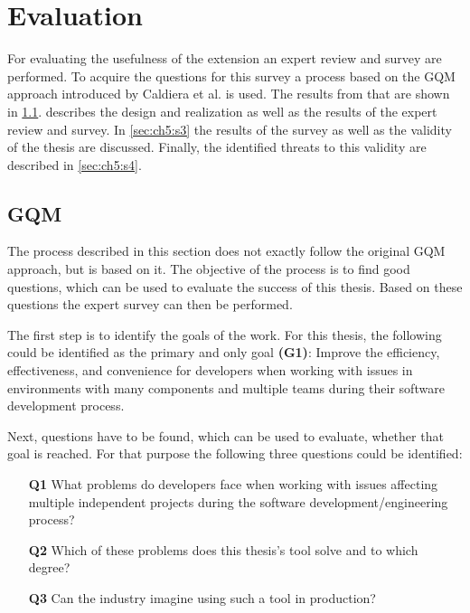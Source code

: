 
\chapter{Evaluation}
\label{chap:ch5}
For evaluating the usefulness of the extension an expert review and survey are performed.
To acquire the questions for this survey a process based on the \gls{GQM} approach introduced by Caldiera et al. \cite{caldiera1994goal} is used.
The results from that are shown in \cref{sec:ch5:s1}.
 describes the design and realization as well as the results of the expert review and survey.
In \cref{sec:ch5:s3} the results of the survey as well as the validity of the thesis are discussed.
Finally, the identified threats to this validity are described in \cref{sec:ch5:s4}.

\section{GQM}
\label{sec:ch5:s1}
The process described in this section does not exactly follow the original \gls{GQM} approach,
but is based on it.
The objective of the process is to find good questions, which can be used to evaluate the success of this thesis.
Based on these questions the expert survey can then be performed.

The first step is to identify the goals of the work.
For this thesis, the following could be identified as the primary and only goal \textbf{(G1)}:
Improve the efficiency, effectiveness, and convenience for developers when working with issues in environments with many components and multiple teams during their software development process. 

Next, questions have to be found, which can be used to evaluate, whether that goal is reached.
For that purpose the following three questions could be identified:
\begin{itemize}
	\item[\textbf{Q1}] What problems do developers face when working with issues affecting multiple independent projects during the software development/engineering process?
	\item[\textbf{Q2}] Which of these problems does this thesis's tool solve and to which degree?
	\item[\textbf{Q3}] Can the industry imagine using such a tool in production?
\end{itemize}

